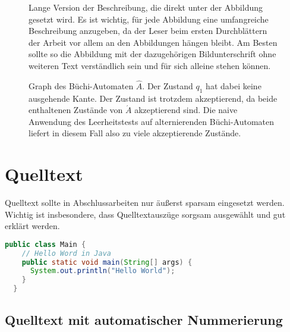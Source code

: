 \begin{figure}
  \centering
  \caption[Kurzfassung der Beschreibung für das Abbildungsverzeichnis]{Lange Version der Beschreibung, die direkt unter der Abbildung gesetzt wird. Es ist wichtig, für jede Abbildung eine umfangreiche Beschreibung anzugeben, da der Leser beim ersten Durchblättern der Arbeit vor allem an den Abbildungen hängen bleibt. Am Besten sollte so die Abbildung mit der dazugehörigen Bildunterschrift ohne weiteren Text verständlich sein und für sich alleine stehen können.}
  \label{fig:flower}
\end{figure}

\begin{figure}
  \centering
  \caption[Graph des Büchi-Automaten $\hat A$.]{Graph des Büchi-Automaten $\hat A$. Der Zustand $q_1$ hat dabei keine ausgehende Kante. Der Zustand ist trotzdem akzeptierend, da beide enthaltenen Zustände von $\acute A$ akzeptierend sind. Die naive Anwendung des Leerheitstests auf alternierenden Büchi-Automaten liefert in diesem Fall also zu viele akzeptierende Zustände.}
  \label{fig:buechi}
\end{figure}

\section{Quelltext}

Quelltext sollte in Abschlussarbeiten nur äußerst sparsam eingesetzt werden. Wichtig ist insbesondere, dass Quelltextauszüge sorgsam ausgewählt und gut erklärt werden.

\begin{lstlisting}[language=Java,gobble=2]
  public class Main {
    // Hello Word in Java
    public static void main(String[] args) {
      System.out.println("Hello World");
    }
  }
\end{lstlisting}

\subsection{Quelltext mit automatischer Nummerierung}

